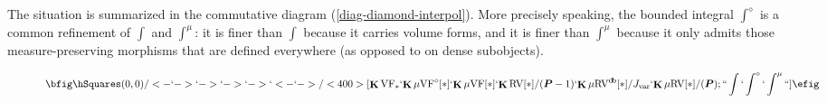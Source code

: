 \documentclass[12pt]{amsart}
\theoremstyle{plain}
\theoremstyle{definition}
\theoremstyle{remark}
\numberwithin{equation}{section}
\theoremstyle{plain}
\newcommand{\VF}{\textup{VF}}
\newcommand{\RV}{\textup{RV}}
\DeclareMathOperator{\id}{id}
\newcommand{\A}{\mathds{A}}
\newcommand{\C}{\mathds{C}}
\newcommand{\0}{\emptyset}
\newcommand{\bb}[1]{\mathbb{#1}}
\newcommand{\mgVF}{{\mu} {\VF}}
\newcommand{\mgRV}{{\mu}{\RV}}
\newcommand{\RES}{\textup{RES}}
\newcommand{\mgRES}{{\mu}{\RES}}
\newcommand{\mgE}{{\mu}{\bb E}}
\DeclareMathOperator{\ggk}{\mathbf{K}}
\DeclareMathOperator{\sggk}{!\mathbf{K}}
\DeclareMathOperator{\db}{d \! b}
\newcommand{\var}{\textup{Var}}
\begin{document}
The situation is summarized in the  commutative diagram (\ref{diag-diamond-interpol}). More precisely speaking, the bounded integral $\int^\diamond$ is a common refinement of $\int$ and $\int^\mu$: it is finer than $\int$ because it carries volume forms, and it is finer than $\int^\mu$ because it only admits those measure-preserving morphisms that are defined everywhere (as opposed to on dense subobjects).
\begin{figure}[htb]
\begin{equation}\label{diag-diamond-interpol}
\bfig
  \hSquares(0,0)/<-`->`->`->`->`<-`->/<400>[{\ggk \VF_*}`{\ggk \mgVF^\diamond[*]}`{\ggk \mgVF[*]}`{\ggk \RV[*] / (\bm P - 1)}`{\ggk \mgRV^{\db}[*] / J_{\mathrm{var}}}`{\ggk \mgRV[*] / (\bm P)}; ``\int`\int^{\diamond}`\int^\mu``]
\efig
\end{equation}
\end{figure}



%
%
\end{document}
